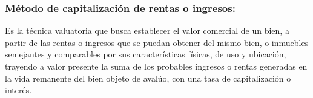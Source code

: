 \documentclass[12pt,a4paper,twoside]{article}
\begin{document}
\subsubsection{Método de capitalización de rentas o ingresos:}  

Es la técnica valuatoria que  busca  establecer  el  valor  comercial  de  un  bien,  a  partir  de  las  rentas  o  ingresos que  se  puedan  obtener  del  mismo  bien,  o  inmuebles  semejantes  y  comparables  por sus  características  físicas,  de  uso  y  ubicación,  trayendo  a  valor  presente  la  suma  de los  probables  ingresos  o  rentas  generadas  en  la  vida  remanente  del  bien  objeto  de avalúo, con una tasa de capitalización o interés.  


%
%
%
%

\end{document}
